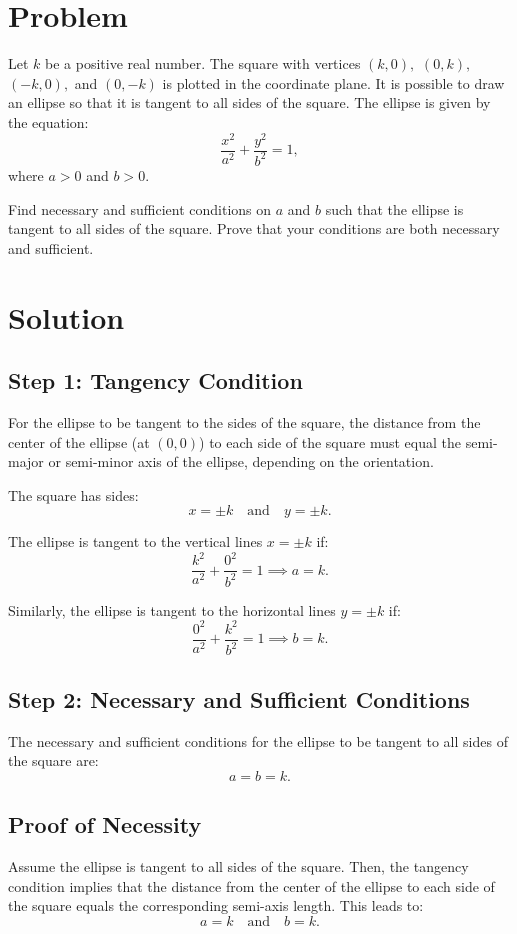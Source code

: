 \documentclass[12pt]{article}
\begin{document}
\section*{Problem}
Let $k$ be a positive real number. The square with vertices $(k,0),$ $(0,k),$ $(-k,0),$ and $(0,-k)$ is plotted in the coordinate plane. It is possible to draw an ellipse so that it is tangent to all sides of the square. The ellipse is given by the equation:
\[
\frac{x^2}{a^2} + \frac{y^2}{b^2} = 1,
\]
where $a > 0$ and $b > 0$. 

Find necessary and sufficient conditions on $a$ and $b$ such that the ellipse is tangent to all sides of the square. Prove that your conditions are both necessary and sufficient.

\section*{Solution}

\subsection*{Step 1: Tangency Condition}
For the ellipse to be tangent to the sides of the square, the distance from the center of the ellipse (at $(0,0)$) to each side of the square must equal the semi-major or semi-minor axis of the ellipse, depending on the orientation.

The square has sides:
\[
x = \pm k \quad \text{and} \quad y = \pm k.
\]

The ellipse is tangent to the vertical lines $x = \pm k$ if:
\[
\frac{k^2}{a^2} + \frac{0^2}{b^2} = 1 \implies a = k.
\]

Similarly, the ellipse is tangent to the horizontal lines $y = \pm k$ if:
\[
\frac{0^2}{a^2} + \frac{k^2}{b^2} = 1 \implies b = k.
\]

\subsection*{Step 2: Necessary and Sufficient Conditions}
The necessary and sufficient conditions for the ellipse to be tangent to all sides of the square are:
\[
a = b = k.
\]

\subsection*{Proof of Necessity}
Assume the ellipse is tangent to all sides of the square. Then, the tangency condition implies that the distance from the center of the ellipse to each side of the square equals the corresponding semi-axis length. This leads to:
\[
a = k \quad \text{and} \quad b = k.
\]
\end{document}
